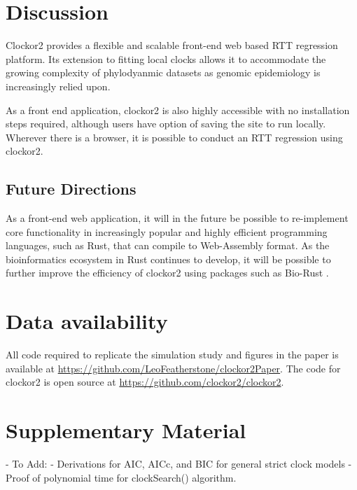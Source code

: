 \documentclass{article}
\begin{document}
\section*{Discussion}
Clockor2 provides a flexible and scalable front-end web based RTT regression platform. Its extension to fitting local clocks allows it to accommodate the growing complexity of phylodyanmic datasets as genomic epidemiology is increasingly relied upon. 

As a front end application, clockor2 is also highly accessible with no installation steps required, although users have option of saving the site to run locally. Wherever there is a browser, it is possible to conduct an RTT regression using clockor2. 

\subsection*{Future Directions}
As a front-end web application, it will in the future be possible to re-implement core functionality in increasingly popular and highly efficient programming languages, such as Rust, that can compile to Web-Assembly format. As the bioinformatics ecosystem in Rust continues to develop, it will be possible to further improve the efficiency of clockor2 using packages such as Bio-Rust \citep{koester_rust-bio-2015}.


\section*{Data availability}
All code required to replicate the simulation study and figures in the paper is available at \url{https://github.com/LeoFeatherstone/clockor2Paper}. The code for clockor2 is open source at \url{https://github.com/clockor2/clockor2}.



\section*{Supplementary Material}
- To Add:
- Derivations for AIC, AICc, and BIC for general strict clock models
- Proof of polynomial time for clockSearch() algorithm.
\end{document}
